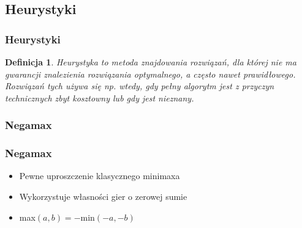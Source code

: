 \documentclass[polish,envcountsect,10pt]{beamer}
\newtheorem{mdfn}{Definicja}
\begin{document}
        \subsection{Heurystyki}
            \begin{frame}
                \frametitle{Heurystyki}
                \begin{mdfn}
                    Heurystyka to metoda znajdowania rozwiązań, dla której nie ma gwarancji znalezienia rozwiązania optymalnego, a często nawet prawidłowego. Rozwiązań tych używa się np. wtedy, gdy pełny algorytm jest z przyczyn technicznych zbyt kosztowny lub gdy jest nieznany.
                \end{mdfn}               
            \end{frame}
            \subsubsection{Negamax}
                \begin{frame}
                    \frametitle{Negamax}
                    \begin{itemize}
                        \item<1-> Pewne uproszczenie klasycznego minimaxa
                        \item<2-> Wykorzystuje własności gier o zerowej sumie
                        \item<3-> max$(a,b) = -$min$(-a,-b)$
                    \end{itemize}
                \end{frame}
            
\end{document}
